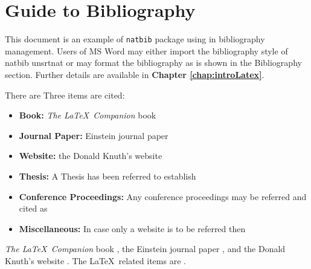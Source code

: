 \chapter{Guide to Bibliography}

\par This document is an example of \texttt{natbib} package using in bibliography management. Users of MS Word may either import the bibliography style of natbib unsrtnat or may format the bibliography as is shown in the Bibliography section. Further details are available in \textbf{Chapter \ref{chap:introLatex}}.

There are Three items are cited: 
\begin{itemize}
	\item{\bf{Book:}} \textit{The \LaTeX\ Companion} book \cite{latexcompanion}
	\item{\bf{Journal Paper:}} Einstein journal paper \cite{einstein}
	\item{\bf{Website:}} the Donald Knuth's website \cite{knuthwebsite}
	\item{\bf{Thesis:}} A Thesis has been referred to establish \cite{prabhu:xx}
	\item{\bf{Conference Proceedings:}} Any conference proceedings may be referred and cited as \cite{viz:mayavi}
	\item{\bf{Miscellaneous:}} In case only a website is to be referred then \cite{py:python}
\end{itemize}
\textit{The \LaTeX\ Companion} book \cite{latexcompanion}, the Einstein journal paper \cite{einstein}, and the Donald Knuth's website \cite{knuthwebsite}. The \LaTeX\ related items are \cite{latexcompanion,knuthwebsite}.
